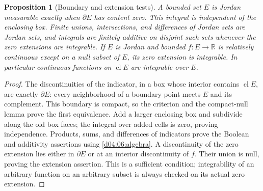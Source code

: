 \documentclass[11pt,oneside,openany]{book}
\newtheorem{proposition}[theorem]{Proposition}
\theoremstyle{definition}
\theoremstyle{remark}
\newcommand{\R}{\mathbb R}
\DeclareMathOperator{\cl}{cl}
\begin{document}
\begin{proposition}[Boundary and extension tests]\label{d04:06:region-test}
A bounded set $E$ is Jordan measurable exactly when $\partial E$ has content zero. This integral is independent of the enclosing box. Finite unions, intersections, and differences of Jordan sets are Jordan sets, and integrals are finitely additive on disjoint such sets whenever the zero extensions are integrable. If $E$ is Jordan and bounded $f:E\to\R$ is relatively continuous except on a null subset of $E$, its zero extension is integrable. In particular continuous functions on $\cl E$ are integrable over $E$.
\end{proposition}
\begin{proof}
The discontinuities of the indicator, in a box whose interior contains $\cl E$, are exactly $\partial E$: every neighborhood of a boundary point meets $E$ and its complement. This boundary is compact, so the criterion and the compact-null lemma prove the first equivalence. Add a larger enclosing box and subdivide along the old box faces; the integral over added cells is zero, proving independence. Products, sums, and differences of indicators prove the Boolean and additivity assertions using \cref{d04:06:algebra}. A discontinuity of the zero extension lies either in $\partial E$ or at an interior discontinuity of $f$. Their union is null, proving the extension assertion. This is a sufficient condition; integrability of an arbitrary function on an arbitrary subset is always checked on its actual zero extension.
\end{proof}
\end{document}
